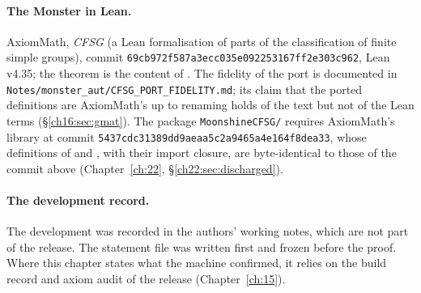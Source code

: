 \paragraph{The Monster in Lean.}  AxiomMath, \emph{CFSG} (a Lean formalisation of parts of the classification of finite
simple groups), commit \texttt{69cb972f587a3ecc035e092253167ff2e303c962}, Lean v4.35; the theorem
 is the content of .  The fidelity of the port is
documented in \texttt{Notes/monster\_aut/CFSG\_PORT\_FIDELITY.md}; its claim that the ported definitions are AxiomMath's
up to renaming holds of the text but not of the Lean terms (\S\ref{ch16:sec:gmat}).  The package \texttt{MoonshineCFSG/}
requires AxiomMath's library at commit \texttt{5437cdc31389dd9aeaa5c2a9465a4e164f8dea33}, whose definitions of
 and , with their import closure, are byte-identical to those of the commit above
(Chapter~\ref{ch:22}, \S\ref{ch22:sec:discharged}).

\paragraph{The development record.}  The development was recorded in the authors' working notes, which are not part of
the release.  The statement file was written first and frozen before the proof.  Where this chapter states what the
machine confirmed, it relies on the build record and axiom audit of the release (Chapter~\ref{ch:15}).

\endgroup
